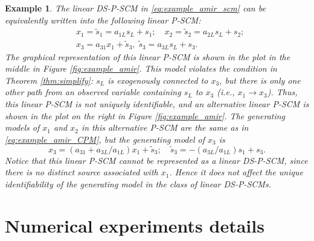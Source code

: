 \documentclass[12pt]{article}
\newtheorem{example}{Example}
\newcommand{\bW}{\mathbf{W}}
\begin{document}
\begin{example}
The linear DS-P-SCM in \eqref{eq:example_amir_scm} can be equivalently written into the following linear P-SCM:
\begin{equation}
\begin{aligned}
&x_1 = \tilde{s}_1 = a_{1L}s_L + s_1;\quad x_2=\tilde{s}_2=a_{2L}s_L + s_2;\\
&x_3 = a_{31} x_1 + \tilde{s}_3,\; \tilde{s}_3 = a_{3L} s_L + s_3.
\end{aligned}
\label{eq:example_amir_CPM}
\end{equation}
The graphical representation of this linear P-SCM is shown in the plot in the middle in Figure \ref{fig:example_amir}. This model violates the condition in Theorem \ref{thm:simplify}: $s_L$ is exogenously connected to $x_3$, but there is only one other path from an observed variable containing $s_L$ to $x_3$ (i.e., $x_1\rightarrow x_3$). Thus, this linear P-SCM is not uniquely identifiable, and an alternative linear P-SCM is shown in the plot on the right in Figure \ref{fig:example_amir}. The generating models of $x_1$ and $x_2$ in this alternative P-SCM are the same as in \eqref{eq:example_amir_CPM}, but the generating model of $x_3$ is
\begin{equation*}
x_3 = (a_{31}+a_{3L}/a_{1L}) x_1 + \tilde{s}_3;\quad \tilde{s}_3 = -(a_{3L}/a_{1L})s_1 + s_3.
\end{equation*}
Notice that this linear P-SCM cannot be represented as a linear DS-P-SCM, since there is no distinct source associated with $x_1$. Hence it does not affect the unique identifiability of the generating model in the class of linear DS-P-SCMs.

\end{example}

\section{Numerical experiments details} \label{app:simulations}
\end{document}
